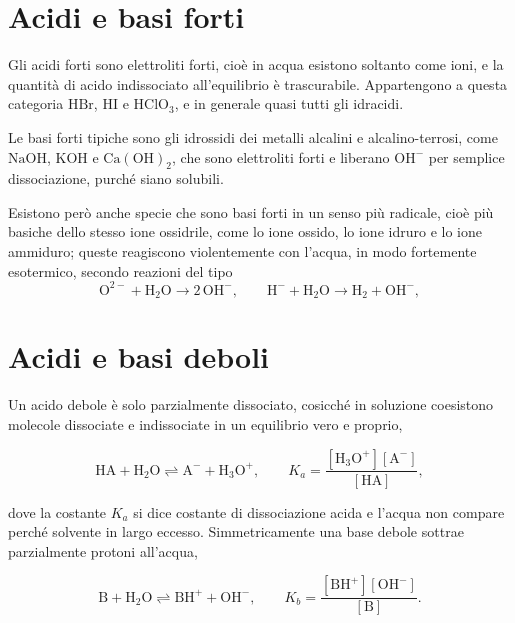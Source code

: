 \section{Acidi e basi forti}
 
Gli acidi forti sono elettroliti forti, cioè in acqua esistono soltanto come ioni, e la quantità di acido indissociato all'equilibrio è trascurabile.
Appartengono a questa categoria $\mathrm{HBr}$, $\mathrm{HI}$ e $\mathrm{HClO_3}$, e in generale quasi tutti gli idracidi.
 
Le basi forti tipiche sono gli idrossidi dei metalli alcalini e alcalino-terrosi, come $\mathrm{NaOH}$, $\mathrm{KOH}$ e $\mathrm{Ca(OH)_2}$, che sono elettroliti forti e liberano $\mathrm{OH^-}$ per semplice dissociazione, purché siano solubili.

Esistono però anche specie che sono basi forti in un senso più radicale, cioè più basiche dello stesso ione ossidrile, come lo ione ossido, lo ione idruro e lo ione ammiduro; queste reagiscono violentemente con l'acqua, in modo fortemente esotermico, secondo reazioni del tipo
\begin{equation}
    \mathrm{O^{2-}} + \mathrm{H_2O} \longrightarrow 2\,\mathrm{OH^-} ,
    \qquad
    \mathrm{H^-} + \mathrm{H_2O} \longrightarrow \mathrm{H_2} + \mathrm{OH^-} ,
    \label{eq:basi_fortissime}
\end{equation}
 
\section{Acidi e basi deboli}
 
Un acido debole è solo parzialmente dissociato, cosicché in soluzione coesistono molecole dissociate e indissociate in un equilibrio vero e proprio,

\begin{equation}
    \mathrm{HA} + \mathrm{H_2O} \rightleftharpoons \mathrm{A^-} + \mathrm{H_3O^+} ,
    \qquad
    K_a = \frac{[\mathrm{H_3O^+}][\mathrm{A^-}]}{[\mathrm{HA}]} ,
    \label{eq:ka}
\end{equation}

dove la costante $K_a$ si dice costante di dissociazione acida e l'acqua non compare perché solvente in largo eccesso.
Simmetricamente una base debole sottrae parzialmente protoni all'acqua,

\begin{equation}
    \mathrm{B} + \mathrm{H_2O} \rightleftharpoons \mathrm{BH^+} + \mathrm{OH^-} ,
    \qquad
    K_b = \frac{[\mathrm{BH^+}][\mathrm{OH^-}]}{[\mathrm{B}]} .
    \label{eq:kb}
\end{equation}
 
